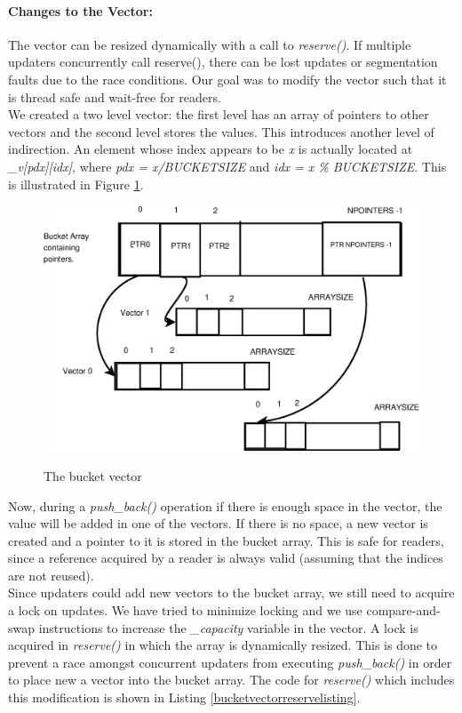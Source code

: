 \documentclass{article}
\begin{document}
\paragraph{Changes to the Vector:}
The vector can be resized dynamically with a call to \emph{reserve()}. If multiple updaters concurrently call reserve(), there can be lost updates or segmentation faults due to the race conditions. Our goal was to modify the vector such that it is thread safe and wait-free for readers.
\\We created a two level vector: the first level has an array of pointers to other vectors and the second level stores the values. This introduces another level of indirection. An element whose index appears to be \emph{x} is actually located at \emph{\_v[pdx][idx]}, where \emph{pdx = x/BUCKETSIZE} and \emph{idx = x \% BUCKETSIZE}. This is illustrated in Figure \ref{bucketvector}. 
\begin{figure}[tph]
\includegraphics[scale = 0.4]{../images/diagrams/bucketvector.eps}
\label{bucketvector}
\caption{The bucket vector}
\end{figure}
Now, during a \emph{push\_back()} operation if there is enough space in the vector, the value will be added in one of the vectors. If there is no space, a new vector is created and a pointer to it is stored in the bucket array. This is safe for readers, since a reference acquired by a reader is always valid (assuming that the indices are not reused).
\\Since updaters could add new vectors to the bucket array, we still need to acquire a lock on updates. We have tried to minimize locking and we use compare-and-swap instructions to increase the \emph{\_capacity} variable in the vector. A lock is acquired in \emph{reserve()} in which the array is dynamically resized. This is done to prevent a race amongst concurrent updaters from executing \emph{push\_back()} in order to place new a vector into the bucket array. The code for \emph{reserve()} which includes this modification is shown in Listing \ref{bucketvectorreservelisting}.
\end{document}
